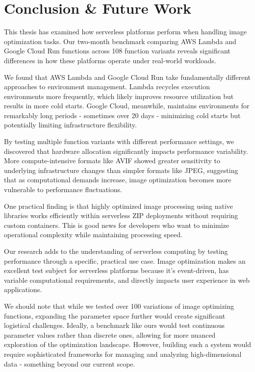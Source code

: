 \section{Conclusion \& Future Work}
\label{cha:conclusion}

This thesis has examined how serverless platforms perform when handling image optimization tasks. Our two-month benchmark comparing AWS Lambda and Google Cloud Run functions across 108 function variants reveals significant differences in how these platforms operate under real-world workloads.

We found that AWS Lambda and Google Cloud Run take fundamentally different approaches to environment management. Lambda recycles execution environments more frequently, which likely improves resource utilization but results in more cold starts. Google Cloud, meanwhile, maintains environments for remarkably long periods - sometimes over 20 days - minimizing cold starts but potentially limiting infrastructure flexibility.

By testing multiple function variants with different performance settings, we discovered that hardware allocation significantly impacts performance variability. More compute-intensive formats like AVIF showed greater sensitivity to underlying infrastructure changes than simpler formats like JPEG, suggesting that as computational demands increase, image optimization becomes more vulnerable to performance fluctuations.

One practical finding is that highly optimized image processing using native libraries works efficiently within serverless ZIP deployments without requiring custom containers. This is good news for developers who want to minimize operational complexity while maintaining processing speed.

Our research adds to the understanding of serverless computing by testing performance through a specific, practical use case. Image optimization makes an excellent test subject for serverless platforms because it's event-driven, has variable computational requirements, and directly impacts user experience in web applications.

We should note that while we tested over 100 variations of image optimizing functions, expanding the parameter space further would create significant logistical challenges. Ideally, a benchmark like ours would test continuous parameter values rather than discrete ones, allowing for more nuanced exploration of the optimization landscape. However, building such a system would require sophisticated frameworks for managing and analyzing high-dimensional data - something beyond our current scope.

